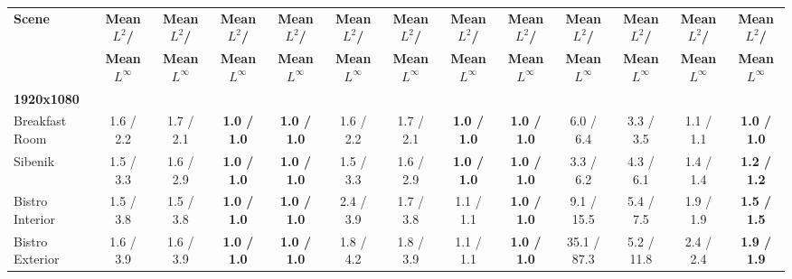\begin{table*}[t]
\begin{tabular}{l cccc|cccc|cccc}
	\textbf{Scene} & \textbf{Mean $L^2$/}   & \textbf{Mean $L^2$/}   & \textbf{Mean $L^2$/}   & \textbf{Mean $L^2$/}   & \textbf{Mean $L^2$/}   & \textbf{Mean $L^2$/}   & \textbf{Mean $L^2$/}   & \textbf{Mean $L^2$/}   & \textbf{Mean $L^2$/}   & \textbf{Mean $L^2$/}   & \textbf{Mean $L^2$/}   & \textbf{Mean $L^2$/}   \\
	& \textbf{Mean $L^\infty$} & \textbf{Mean $L^\infty$} & \textbf{Mean $L^\infty$} & \textbf{Mean $L^\infty$} & \textbf{Mean $L^\infty$} & \textbf{Mean $L^\infty$} & \textbf{Mean $L^\infty$} & \textbf{Mean $L^\infty$} & \textbf{Mean $L^\infty$} & \textbf{Mean $L^\infty$} & \textbf{Mean $L^\infty$} & \textbf{Mean $L^\infty$} \\
	\hline
	\textbf{1920x1080}            & \textbf{}            & \textbf{}            & \textbf{}            & \textbf{}            & \textbf{}            & \textbf{}            & \textbf{}            &                      &                      &                      &                      &                      \\
	Breakfast Room                & 1.6 / 2.2            & 1.7 / 2.1            & \textbf{1.0 / 1.0}          & \textbf{1.0 / 1.0}          & 1.6 / 2.2            & 1.7 / 2.1            & \textbf{1.0 / 1.0}   & \textbf{1.0 / 1.0}          & 6.0 / 6.4             & 3.3 / 3.5            & 1.1 / 1.1            & \textbf{1.0 / 1.0}          \\
	Sibenik                       & 1.5 / 3.3            & 1.6 / 2.9            & \textbf{1.0 / 1.0}          & \textbf{1.0 / 1.0}          & 1.5 / 3.3            & 1.6 / 2.9            & \textbf{1.0 / 1.0}   & \textbf{1.0 / 1.0}          & 3.3 / 6.2             & 4.3 / 6.1            & 1.4 / 1.4            & \textbf{1.2 / 1.2}          \\
	Bistro Interior               & 1.5 / 3.8            & 1.5 / 3.8            & \textbf{1.0 / 1.0}          & \textbf{1.0 / 1.0}          & 2.4 / 3.9            & 1.7 / 3.8            & 1.1 / 1.1            & \textbf{1.0 / 1.0}          & 9.1 / 15.5            & 5.4 / 7.5            & 1.9 / 1.9            & \textbf{1.5 / 1.5}          \\
	Bistro Exterior               & 1.6 / 3.9            & 1.6 / 3.9            & \textbf{1.0 / 1.0}          & \textbf{1.0 / 1.0}          & 1.8 / 4.2            & 1.8 / 3.9            & 1.1 / 1.1            & \textbf{1.0 / 1.0}          & 35.1 / 87.3           & 5.2 / 11.8           & 2.4 / 2.4            & \textbf{1.9 / 1.9}          \\

\end{tabular}
\end{table*}
